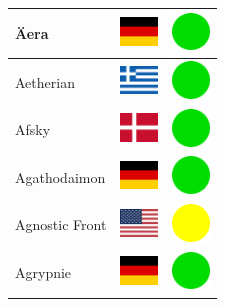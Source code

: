 \documentclass[12pt, a4paper, twoside]{report}
\begin{document}
\begin{center}
\begin{longtable}{|p{5cm}|p{2cm}|p{2cm}|}
 Äera                                                       & \includegraphics[width=1cm]{../img/flags/de} &   \includegraphics[width=1cm]{../likes/y} \\ \hline
 Aetherian                                                  & \includegraphics[width=1cm]{../img/flags/gr} &   \includegraphics[width=1cm]{../likes/y} \\ \hline
 Afsky                                                      & \includegraphics[width=1cm]{../img/flags/dk} &   \includegraphics[width=1cm]{../likes/y} \\ \hline
 Agathodaimon                                               & \includegraphics[width=1cm]{../img/flags/de} &   \includegraphics[width=1cm]{../likes/y} \\ \hline
 Agnostic Front                                             & \includegraphics[width=1cm]{../img/flags/us} &   \includegraphics[width=1cm]{../likes/m} \\ \hline
 Agrypnie                                                   & \includegraphics[width=1cm]{../img/flags/de} &   \includegraphics[width=1cm]{../likes/y} \\ \hline

\end{longtable}
\end{center}
\end{document}
